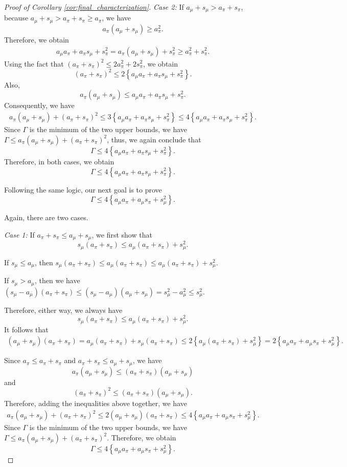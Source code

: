 \documentclass[11pt]{article}
\begin{document}
\begin{proof}[Proof of Corollary \ref{cor:final_characterization}]
\noindent
\emph{Case 2:} If
$a_\mu+s_\mu>a_\pi+s_\pi$, because $a_\mu+s_\mu>a_\pi+s_\pi\ge a_\pi$, we have
\[
a_\pi(a_\mu+s_\mu)\ge a_\pi^2.
\]
Therefore, we obtain
\begin{align*}
a_\mu a_\pi+a_\pi s_\mu+s_\pi^2=
a_\pi(a_\mu+s_\mu)+s_\pi^2\ge
a_\pi^2+s_\pi^2.
\end{align*}
Using the fact that $(a_\pi+s_\pi)^2
\le
2a_\pi^2+2s_\pi^2$, we obtain
\[
(a_\pi+s_\pi)^2
\le
2\left\{
a_\mu a_\pi+a_\pi s_\mu+s_\pi^2
\right\}.
\]
Also,
\[
a_\pi(a_\mu+s_\mu)
\le
a_\mu a_\pi+a_\pi s_\mu+s_\pi^2.
\]
Consequently, we have
\begin{align*}
a_\pi(a_\mu+s_\mu)+(a_\pi+s_\pi)^2
\le
3\left\{
a_\mu a_\pi+a_\pi s_\mu+s_\pi^2
\right\}
\le
4\left\{
a_\mu a_\pi+a_\pi s_\mu+s_\pi^2
\right\}.
\end{align*}
Since $\Gamma$ is the minimum of the two upper bounds, we have $\Gamma
\le
a_\pi(a_\mu+s_\mu)+(a_\pi+s_\pi)^2$, thus, we again conclude that
\[
\Gamma
\le
4\left\{
a_\mu a_\pi+a_\pi s_\mu+s_\pi^2
\right\}.
\]
Therefore, in both cases, we obtain
\[
\Gamma
\le
4\left\{
a_\mu a_\pi+a_\pi s_\mu+s_\pi^2
\right\}.
\]

Following the same logic, our next goal is to prove
\[
\Gamma
\le
4\left\{
a_\mu a_\pi+a_\mu s_\pi+s_\mu^2
\right\}.
\]

Again, there are two cases.

\emph{Case 1:} If $a_\pi+s_\pi\le a_\mu+s_\mu$, we first show that
\[
s_\mu(a_\pi+s_\pi)
\le
a_\mu(a_\pi+s_\pi)+s_\mu^2.
\]

If \(s_\mu\le a_\mu\), then $s_\mu(a_\pi+s_\pi)
\le
a_\mu(a_\pi+s_\pi)
\le
a_\mu(a_\pi+s_\pi)+s_\mu^2$.

If \(s_\mu>a_\mu\), then we have
$(s_\mu-a_\mu)(a_\pi+s_\pi)
\le
(s_\mu-a_\mu)(a_\mu+s_\mu)
=
s_\mu^2-a_\mu^2
\le
s_\mu^2$.

Therefore, either way, we always have
\[
s_\mu(a_\pi+s_\pi)
\le
a_\mu(a_\pi+s_\pi)+s_\mu^2.
\]
It follows that
\begin{align*}
(a_\mu+s_\mu)(a_\pi+s_\pi)=
a_\mu(a_\pi+s_\pi)
+
s_\mu(a_\pi+s_\pi)
\le
2\left\{
a_\mu(a_\pi+s_\pi)+s_\mu^2
\right\}
=
2\left\{
a_\mu a_\pi+a_\mu s_\pi+s_\mu^2
\right\}.
\end{align*}

Since  $
a_\pi\le a_\pi+s_\pi$ and $a_\pi+s_\pi\le a_\mu+s_\mu$, we have
\[
a_\pi(a_\mu+s_\mu)
\le
(a_\pi+s_\pi)(a_\mu+s_\mu)
\]
and
\[
(a_\pi+s_\pi)^2
\le
(a_\pi+s_\pi)(a_\mu+s_\mu).
\]
Therefore, adding the inequalities above together, we have
\begin{align*}
a_\pi(a_\mu+s_\mu)+(a_\pi+s_\pi)^2\le
2(a_\mu+s_\mu)(a_\pi+s_\pi)\le
4\left\{
a_\mu a_\pi+a_\mu s_\pi+s_\mu^2
\right\}.
\end{align*}
Since $\Gamma$ is the minimum of the two upper bounds, we have $\Gamma
\le
a_\pi(a_\mu+s_\mu)+(a_\pi+s_\pi)^2$. Therefore,
we obtain
\[
\Gamma
\le
4\left\{
a_\mu a_\pi+a_\mu s_\pi+s_\mu^2
\right\}.
\]


\end{proof}
\end{document}
